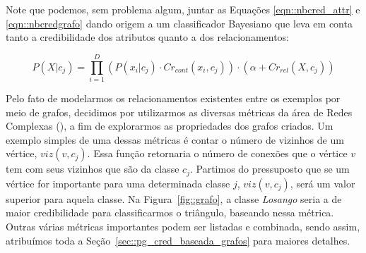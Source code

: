 

Note que podemos, sem problema algum, juntar as Equações \ref{eqn::nbcred_attr} e \ref{eqn::nbcredgrafo} dando origem a um classificador Bayesiano que leva em conta tanto a credibilidade dos atributos quanto a dos relacionamentos:

\begin{equation}\label{eqn::nbcredcompleta}
P(X|c_{j}) = \prod^{D}_{i=1}{(P(x_i|c_j) \cdot Cr_{cont}(x_i,c_j)) \cdot (\alpha + Cr_{rel}(X,c_j)) } 
\end{equation}

Pelo fato de modelarmos os relacionamentos existentes entre os exemplos por meio de grafos, decidimos por utilizarmos as diversas métricas da área de Redes Complexas (\cite{Newman03}), a fim de explorarmos as propriedades dos grafos criados. Um exemplo simples de uma dessas métricas é contar o número de vizinhos de um vértice, $viz(v,c_j)$. Essa função retornaria o número de conexões  que o vértice $v$ tem com seus vizinhos que são da classe $c_j$. Partimos do pressuposto que se um vértice for importante para uma determinada classe $j$, $viz(v,c_j)$, será um valor superior para aquela classe. Na Figura~\ref{fig::grafo}, a classe \textit{Losango} seria a de maior credibilidade para classificarmos o triângulo, baseando nessa métrica. Outras várias métricas importantes podem ser listadas e combinada, sendo assim, atribuímos toda a Seção~\ref{sec::pg_cred_baseada_grafos} para maiores detalhes.  


